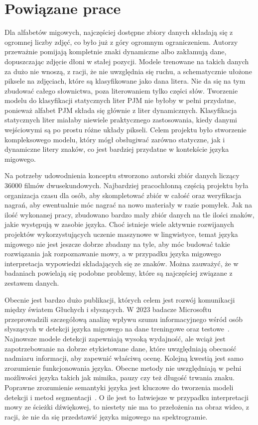 \section{Powiązane prace}
\label{sec:related-works}

Dla alfabetów migowych, najczęściej dostępne zbiory danych składają się z ogromnej liczby zdjęć, co było już z góry ogromnym ograniczeniem. Autorzy przeważnie pomijają kompletnie znaki dynamiczne albo zakłamują dane, dopuszczając zdjęcie dłoni w stałej pozycji. Modele trenowane na takich danych za dużo nie wnoszą, z racji, że nie uwzględnia się ruchu, a schematycznie ułożone piksele na zdjęciach, które są klasyfikowane jako dana litera. Nie da się na tym zbudować całego słownictwa, poza literowaniem tylko części słów. Tworzenie modelu do klasyfikacji statycznych liter PJM nie byłoby w pełni przydatne, ponieważ alfabet PJM składa się głównie z liter dynamicznych. Klasyfikacja statycznych liter miałaby niewiele praktycznego zastosowania, kiedy danymi wejściowymi są po prostu różne układy pikseli. Celem projektu było stworzenie kompleksowego modelu, który mógł obsługiwać zarówno statyczne, jak i dynamiczne litery znaków, co jest bardziej przydatne w kontekście języka migowego.

Na potrzeby udowodnienia konceptu stworzono autorski zbiór danych liczący 36000 filmów dwusekundowych. Najbardziej pracochłonną częścią projektu była organizacja czasu dla osób, aby skompletować zbiór w całość oraz weryfikacja nagrań, aby ewentualnie móc nagrać na nowo materiały w razie pomyłek. Jak na ilość wykonanej pracy, zbudowano bardzo mały zbiór danych na tle ilości znaków, jakie występują w zasobie języka. Choć istnieje wiele aktywnie rozwijanych projektów wykorzystujących uczenie maszynowe w lingwistyce, temat języka migowego nie jest jeszcze dobrze zbadany na tyle, aby móc budować takie rozwiązania jak rozpoznawanie mowy, a w przypadku języka migowego interpretacja wypowiedzi składających się ze znaków. Można zauważyć, że w badaniach powielają się podobne problemy, które są najczęściej związane z zestawem danych.

Obecnie jest bardzo dużo publikacji, których celem jest rozwój komunikacji między światem Głuchych i słyszących. W 2023 badacze Microsoftu przeprowadzili szczegółową analizę wpływu szumu informacyjnego wśród osób słyszących w detekcji języka migowego na dane treningowe oraz testowe~\cite{pal2023}. Najnowsze modele detekcji zapewniają wysoką wydajność, ale wciąż jest zapotrzebowanie na dobrze etykietowane dane, które uwzględniają obecność nadmiaru informacji, aby zapewnić właściwą ocenę. Kolejną kwestią jest samo zrozumienie funkcjonowania języka. Obecne metody nie uwzględniają w pełni możliwości języka takich jak mimika, pauzy czy też długość trwania znaku. Poprawne zrozumienie semantyki języka jest kluczowe do tworzenia modeli detekcji i metod segmentacji~\cite{deSisto2021}. O ile jest to łatwiejsze w przypadku interpretacji mowy ze ścieżki dźwiękowej, to niestety nie ma to przełożenia na obraz wideo, z racji, że nie da się przedstawić języka migowego na spektrogramie.
